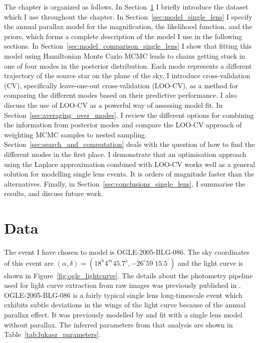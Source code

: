 \documentclass[12pt,dvipsnames]{report}
\begin{document}
The chapter is organized as follows.  In Section~\ref{sec:data_single_lens} I briefly 
introduce the dataset which I use throughout the chapter. In Section~\ref{sec:model_single_lens}
I specify the annual parallax model for the magnification, the likelihood function,
and the priors, which forms a complete description of the model I use in the following 
sections. In Section~\ref{sec:model_comparison_single_lens} I show that fitting this  
model using Hamiltonian Monte Carlo MCMC leads to chains getting stuck in one of four 
modes in the posterior distribution. Each mode represents a different trajectory 
of the source star on the plane of the sky.  I introduce cross-validation (CV), 
specifically leave-one-out cross-validation (LOO-CV), as a method for comparing the 
different modes based on their predictive performance. I also discuss the use of LOO-CV
as a powerful way of assessing model fit. In Section~\ref{sec:averaging_over_modes},
I review the different options for combining the information from posterior modes and 
compare the LOO-CV approach of weighting MCMC samples to nested sampling.
Section~\ref{sec:search_and_computation} deals with the question of how to find 
the different modes in the first place. I demonstrate that an optimisation approach 
using the Laplace approximation combined with LOO-CV works well as a general solution 
for modelling single lens events. It is orders of magnitude faster than the alternatives.
Finally, in Section~\ref{sec:conclusions_single_lens}, I summarise the results, 
and discuss future  work.

\section{Data}
\label{sec:data_single_lens}
The event I have chosen to model is OGLE-2005-BLG-086. The sky coordinates of this event
are $(\alpha, \delta)=(18^h 4^m 45.7^s, -26^\circ 59^\prime 15.5^\prime)$ and the 
light curve is shown in Figure~\ref{fig:ogle_lightcurve}. 
The details about the photometry pipeline used for light curve extraction from raw images 
was previously published in \citet{2008AcA....58...69U}.
OGLE-2005-BLG-086 is a fairly typical single lens long-timescale event which exhibits subtle 
deviations in the wings of the light curve because of the annual parallax effect.
It was previously modelled by \citet{2015ApJS..216...12W} and fit with a single lens model 
without parallax. The inferred parameters from that analysis are shown in 
Table~\ref{tab:lukasz_parameters}.
\end{document}
